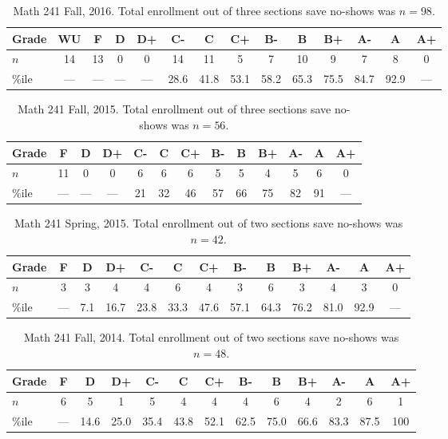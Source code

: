 \documentclass[12pt]{article}
\begin{document}
\begin{table}[h]
\centering
\begin{tabular}{l|ccccccccccccc}
Grade & WU & F   & D      & D+   & C-    & C     & C+    & B-    & B     & B+   & A-    & A      & A+ \\ \hline
$n$   &  14          & 13 & 0      & 0     & 14    & 11   & 5       & 7     & 10    & 9     & 7      & 8      & 0 \\
\%ile     &  ---       & --- & ---  &  ---    & 28.6 & 41.8 & 53.1  & 58.2 & 65.3 & 75.5 & 84.7 & 92.9 & --- \\ \hline
\end{tabular}
\caption{Math 241 Fall, 2016. Total enrollment out of three sections save no-shows was $n=98$.}
\end{table}
\FloatBarrier

\begin{table}[h]
\centering
\begin{tabular}{l|cccccccccccc}
Grade & F   & D      & D+   & C-    & C     & C+    & B-    & B     & B+   & A-    & A      & A+ \\ \hline
$n$   & 11    & 0      & 0     & 6      & 6     & 6      & 5     & 5     & 4     & 5      & 6      & 0 \\
\%ile & --- & ---  &  ---        & 21    & 32   & 46    & 57   & 66   & 75 & 82 & 91 & --- \\ \hline
\end{tabular}
\caption{Math 241 Fall, 2015. Total enrollment out of three sections save no-shows was $n=56$.}
\end{table}
\FloatBarrier

\begin{table}[h]
\centering
\begin{tabular}{l|cccccccccccc}
Grade & F   & D      & D+   & C-    & C     & C+    & B-    & B     & B+   & A-    & A      & A+ \\ \hline
$n$   & 3    & 3      & 4      & 4      & 6     & 4      & 3     & 6      & 3     & 4      & 3      & 0 \\
\%ile & --- & 7.1  &  16.7 & 23.8 & 33.3 & 47.6 & 57.1 & 64.3 & 76.2 &  81.0 & 92.9 & --- \\ \hline
\end{tabular}
\caption{Math 241 Spring, 2015. Total enrollment out of two sections save no-shows was $n=42$.}
\end{table}
\FloatBarrier

\begin{table}[h]
\centering
\begin{tabular}{l|cccccccccccc}
Grade & F & D & D+ & C- & C & C+ & B- & B & B+ & A- & A & A+ \\ \hline
$n$ & 6 & 5 & 1 & 5 & 4 & 4 & 4 & 6 & 4 & 2 & 6 & 1 \\
\%ile & --- & 14.6 &  25.0 & 35.4 & 43.8 & 52.1 & 62.5 & 75.0 & 66.6 &  83.3 & 87.5 & 100 \\ \hline
\end{tabular}
\caption{Math 241 Fall, 2014. Total enrollment out of two sections save no-shows was $n=48$.}
\end{table}
\FloatBarrier
\end{document}
